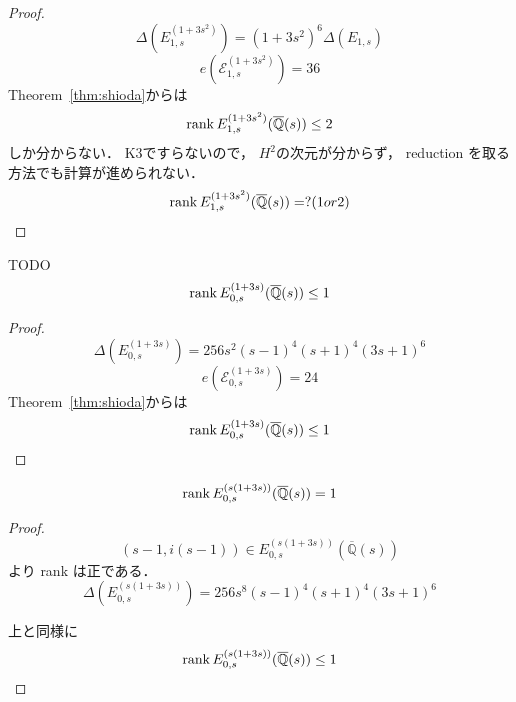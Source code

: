 \documentclass[main]{subfiles}
\begin{document}
\begin{proof}
    \begin{equation}
        \Delta(E_{1,s}^{(1 + 3s^{2})}) = (1 + 3s^{2})^{6} \Delta(E_{1,s})
    \end{equation}
    \begin{equation}
        e(\mathcal{E}_{1,s}^{(1 + 3s^{2})}) = 36
    \end{equation}
    Theorem~\ref{thm:shioda}からは
    \begin{equation}
        \operatorname{rank} E_{1,s}^{(1 + 3s^{2})}(\overline{\mathbb{Q}}(s)) \leq 2
    \end{equation}
    しか分からない．
    K3ですらないので， $H^2$の次元が分からず， reduction を取る方法でも計算が進められない．
    \begin{equation}
        \operatorname{rank} E_{1,s}^{(1 + 3s^{2})}(\overline{\mathbb{Q}}(s)) = ? (1 or 2)
    \end{equation}
\end{proof}


\begin{thm}
    TODO
    \begin{equation}
        \operatorname{rank} E_{0,s}^{(1 + 3s)}(\overline{\mathbb{Q}}(s)) \leq 1
    \end{equation}
\end{thm}
\begin{proof}
    \begin{equation}
        \Delta(E_{0,s}^{(1 + 3s)}) = 256s^{2}(s - 1)^{4}(s + 1)^{4}(3s + 1)^{6}
    \end{equation}
    \begin{equation}
        e(\mathcal{E}_{0,s}^{(1 + 3s)}) = 24
    \end{equation}
    Theorem~\ref{thm:shioda}からは
    \begin{equation}
        \operatorname{rank} E_{0,s}^{(1 + 3s)}(\overline{\mathbb{Q}}(s)) \leq 1
    \end{equation}
\end{proof}

\begin{thm}
    \begin{equation}
        \operatorname{rank} E_{0,s}^{(s(1 + 3s))}(\overline{\mathbb{Q}}(s)) = 1
    \end{equation}
\end{thm}
\begin{proof}
    \begin{equation}
        (s - 1, i(s - 1)) \in E_{0,s}^{(s(1 + 3s))}(\overline{\mathbb{Q}}(s))
    \end{equation}
    より rank は正である．
    \begin{equation}
        \Delta(E_{0,s}^{(s(1 + 3s))}) = 256s^{8}(s - 1)^{4}(s + 1)^{4}(3s + 1)^{6}
    \end{equation}

    上と同様に
    \begin{equation}
        \operatorname{rank} E_{0,s}^{(s(1 + 3s))}(\overline{\mathbb{Q}}(s)) \leq 1
    \end{equation}
\end{proof}
\end{document}
